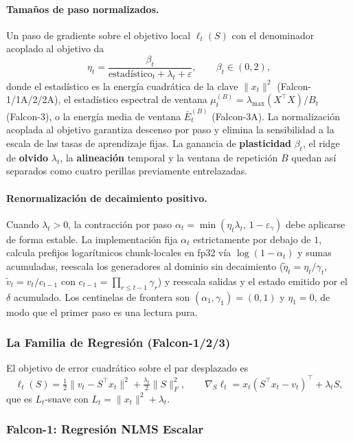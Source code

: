 \paragraph{Tamaños de paso normalizados.} Un paso de gradiente sobre el objetivo local $\ell_t(S)$ con el denominador acoplado al objetivo da
\[
\eta_t = \frac{\beta_t}{\text{estadístico}_t + \lambda_t + \varepsilon}, \qquad \beta_t \in (0, 2),
\]
donde el estadístico es la energía cuadrática de la clave $\|x_t\|^2$ (Falcon-1/1A/2/2A), el estadístico espectral de ventana $\mu_t^{(B)} = \lambda_{\max}(X^\top X)/B_t$ (Falcon-3), o la energía media de ventana $\bar{E}_t^{(B)}$ (Falcon-3A). La normalización acoplada al objetivo garantiza descenso por paso y elimina la sensibilidad a la escala de las tasas de aprendizaje fijas. La ganancia de \textbf{plasticidad} $\beta_t$, el ridge de \textbf{olvido} $\lambda_t$, la \textbf{alineación} temporal y la ventana de repetición $B$ quedan así separados como cuatro perillas previamente entrelazadas.

\paragraph{Renormalización de decaimiento positivo.} Cuando $\lambda_t > 0$, la contracción por paso $\alpha_t = \min(\eta_t \lambda_t,\, 1 - \varepsilon_\gamma)$ debe aplicarse de forma estable. La implementación fija $\alpha_t$ estrictamente por debajo de $1$, calcula prefijos logarítmicos chunk-locales en fp32 vía $\log(1 - \alpha_t)$ y sumas acumuladas, reescala los generadores al dominio sin decaimiento ($\tilde{\eta}_t = \eta_t / \gamma_t$, $\tilde{v}_t = v_t / c_{t-1}$ con $c_{t-1} = \prod_{r \le t-1} \gamma_r$) y reescala salidas y el estado emitido por el $\delta$ acumulado. Los centinelas de frontera son $(\alpha_1, \gamma_1) = (0, 1)$ y $\eta_1 = 0$, de modo que el primer paso es una lectura pura.

\subsubsection{La Familia de Regresión (Falcon-1/2/3)}

El objetivo de error cuadrático sobre el par desplazado es
\[
\ell_t(S) = \tfrac{1}{2}\|v_t - S^\top x_t\|^2 + \tfrac{\lambda_t}{2}\|S\|_F^2,
\qquad
\nabla_S \ell_t = x_t (S^\top x_t - v_t)^\top + \lambda_t S,
\]
que es $L_t$-suave con $L_t = \|x_t\|^2 + \lambda_t$.

\subsubsection{Falcon-1: Regresión NLMS Escalar}

